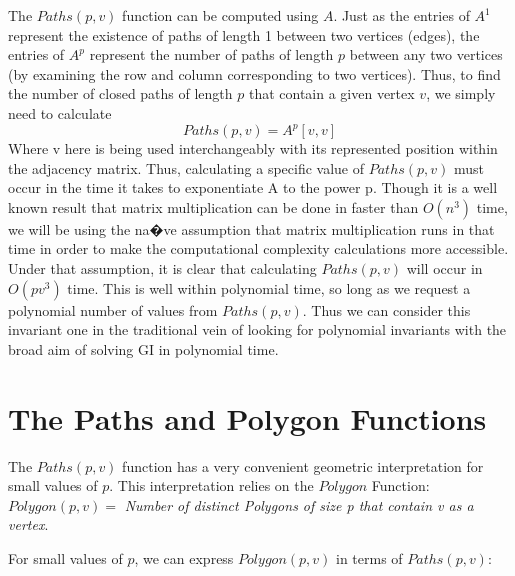 \documentclass[a4paper,12pt]{article}
\begin{document}
The \(Paths(p, v)\) function can be computed using \(A\). Just as the entries of \(A^1\) represent the existence of paths of length 1 between two vertices (edges), the entries of \(A^p\) represent the number of paths of length \(p\) between any two vertices (by examining the row and column corresponding to two vertices). Thus, to find the number of closed paths of length \(p\) that contain a given vertex \(v\), we simply need to calculate \[Paths(p, v) = A^p[v, v]\]Where v here is being used interchangeably with its represented position within the adjacency matrix. Thus, calculating a specific value of \(Paths(p, v)\) must occur in the time it takes to exponentiate A to the power p.  Though it is a well known result that matrix multiplication can be done in faster than \(O(n^3)\) time, we will be using the na�ve assumption that matrix multiplication runs in that time in order to make the computational complexity calculations more accessible.  Under that assumption, it is clear that calculating \(Paths(p, v)\) will occur in \(O(pv^3)\) time. This is well within polynomial time, so long as we request a polynomial number of values from \(Paths(p, v)\). Thus we can consider this invariant one in the traditional vein of looking for polynomial invariants with the broad aim of solving GI in polynomial time.



\section {The Paths and Polygon Functions}

The \(Paths(p, v)\) function has a very convenient geometric interpretation for small values of \(p\). This interpretation relies on the \(Polygon\) Function: \(Polygon(p, v) = \) \emph{Number of distinct Polygons of size p that contain v as a vertex}.

For small values of \(p\), we can express \(Polygon(p, v)\) in terms of \(Paths(p, v)\):
\end{document}
